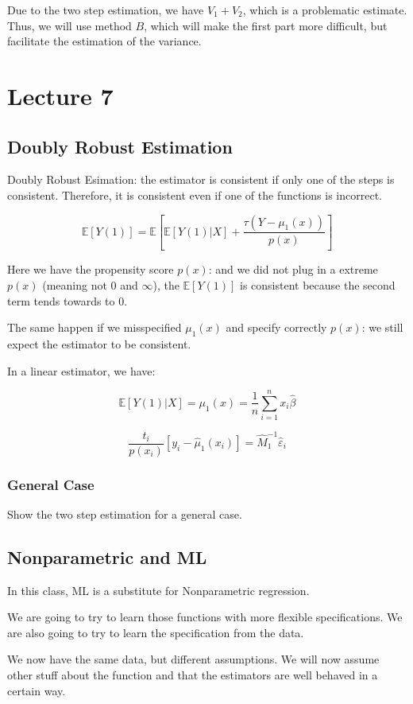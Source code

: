 \documentclass{article}
\begin{document}
Due to the two step estimation, we have $V_1 + V_2$, which is a problematic estimate. Thus, we will use method $B$, which will make the first part more difficult, but facilitate the estimation of the variance.

\section{Lecture 7}
\subsection{Doubly Robust Estimation}

Doubly Robust Esimation: the estimator is consistent if only one of the steps is consistent. Therefore, it is consistent even if one of the functions is incorrect.

$$
\mathbb{E}[Y(1)] =
\mathbb{E}\left[\mathbb{E}[Y(1) | X] + \frac{\tau (Y - \mu_1(x))}{p(x)}\right]
$$

Here we have the propensity score $p(x)$: and we did not plug in a extreme $p(x)$ (meaning not 0 and $\infty$), the $\mathbb{E}[Y(1)]$ is consistent because the second term tends towards to 0.

The same happen if we misspecified $\mu_1(x)$ and specify correctly $p(x)$: we still expect the estimator to be consistent.

In a linear estimator, we have:

$$
\mathbb{E}[Y(1) | X] = \mu_1(x) = \frac{1}{n} \sum_{i=1}^n x_i \hat{\beta}
$$

$$
\frac{t_i}{p(x_i)} \left[ y_i - \hat{\mu}_1 (x_i) \right] = \hat{M}_1^{-1} \hat{\varepsilon}_i
$$

\subsubsection{General Case}
Show the two step estimation for a general case.

\subsection{Nonparametric and ML}
In this class, ML is a substitute for Nonparametric regression.

We are going to try to learn those functions with more flexible specifications. We are also going to try to learn the specification from the data.

We now have the same data, but different assumptions. We will now assume other stuff about the function and that the estimators are well behaved in a certain way.
\end{document}
